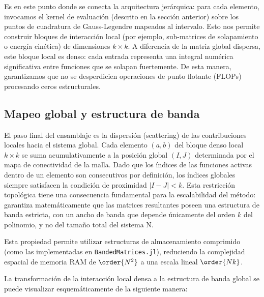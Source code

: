 Es en este punto donde se conecta la arquitectura jerárquica: para cada elemento, invocamos el kernel de evaluación (descrito en la sección anterior) sobre los puntos de cuadratura de Gauss-Legendre mapeados al intervalo. Esto nos permite construir bloques de interacción local (por ejemplo, sub-matrices de solapamiento o energía cinética) de dimensiones \( k \times k \). A diferencia de la matriz global dispersa, este bloque local es denso: cada entrada representa una integral numérica significativa entre funciones que se solapan fuertemente. De esta manera, garantizamos que no se desperdicien operaciones de punto flotante (FLOPs) procesando ceros estructurales.

\subsection{Mapeo global y estructura de banda}

El paso final del ensamblaje es la dispersión (scattering) de las contribuciones locales hacia el sistema global. Cada elemento \( (a,b) \) del bloque denso local \( k\times k \) se suma acumulativamente a la posición global \( (I,J) \) determinada por el mapa de conectividad de la malla.
Dado que los índices de las funciones activas dentro de un elemento son consecutivos por definición, los índices globales siempre satisfacen la condición de proximidad \( |I-J| < k \). Esta restricción topológica tiene una consecuencia fundamental para la escalabilidad del método: garantiza matemáticamente que las matrices resultantes poseen una estructura de banda estricta, con un ancho de banda que depende únicamente del orden \( k \) del polinomio, y no del tamaño total del sistema N.

Esta propiedad permite utilizar estructuras de almacenamiento comprimido (como las implementadas en \texttt{BandedMatrices.jl}), reduciendo la complejidad espacial de memoria RAM de \( \order{N^2} \) a una escala lineal \( \order{Nk} \).

La transformación de la interacción local densa a la estructura de banda global se puede visualizar esquemáticamente de la siguiente manera:

